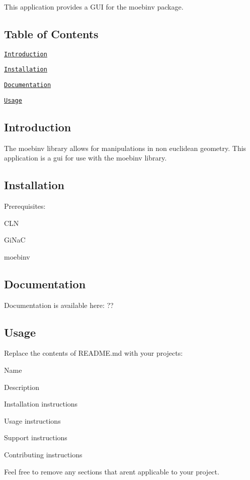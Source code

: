 This application provides a G\+UI for the moebinv package.

\subsection*{Table of Contents}


\begin{DoxyItemize}
\item \href{#introduction}{\tt Introduction}
\item \href{#installation}{\tt Installation}
\item \href{#documentation}{\tt Documentation}
\item \href{#usage}{\tt Usage}
\end{DoxyItemize}

\subsection*{Introduction}

The moebinv library allows for manipulations in non euclidean geometry. This application is a gui for use with the moebinv library.

\subsection*{Installation}

Prerequisites\+:
\begin{DoxyItemize}
\item C\+LN
\item Gi\+NaC
\item moebinv
\end{DoxyItemize}

\subsection*{Documentation}

Documentation is available here\+: ??

\subsection*{Usage}

Replace the contents of {\ttfamily R\+E\+A\+D\+M\+E.\+md} with your project\textquotesingle{}s\+:


\begin{DoxyItemize}
\item Name
\item Description
\item Installation instructions
\item Usage instructions
\item Support instructions
\item Contributing instructions
\end{DoxyItemize}

Feel free to remove any sections that aren\textquotesingle{}t applicable to your project. 